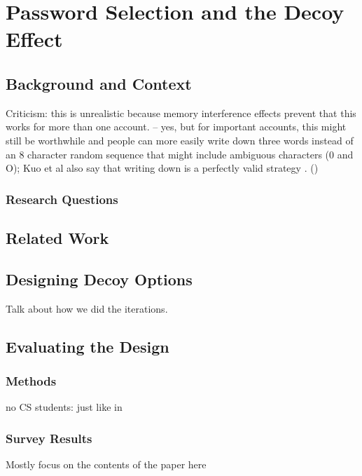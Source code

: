 \chapter[Password Selection and the Decoy Effect]{Password Selection and the Decoy Effect}\label{chap:decoy}


\section{Background and Context}



Criticism: this is unrealistic because memory interference effects prevent that this works for more than one account. -- yes, but for important accounts, this might still be worthwhile and people can more easily write down three words instead of an 8 character random sequence that might include ambiguous characters (0 and O); Kuo et al also say that writing down is a perfectly valid strategy \cite{Kuo2006HumanSelectionMnemonic}. ()

\subsection{Research Questions}

\section{Related Work}

\section{Designing Decoy Options}

Talk about how we did the iterations.

\section{Evaluating the Design}
\subsection{Methods}

no CS students: just like in \cite{Wash2016UnderstandingPasswordChoices}

\subsection{Survey Results}
Mostly focus on the contents of the paper here

